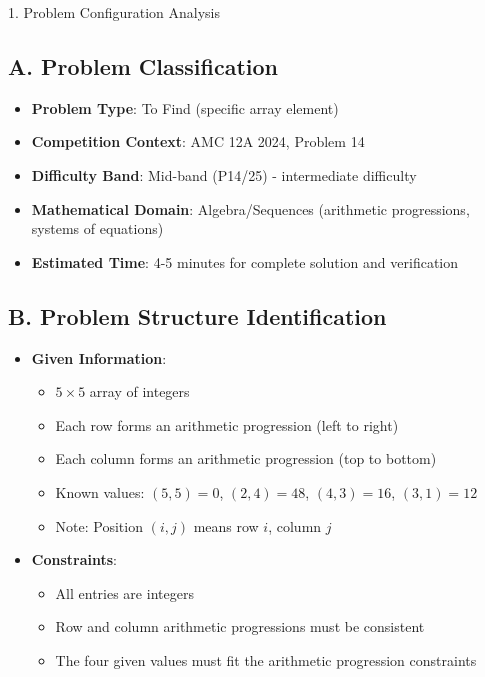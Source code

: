 \documentclass[12pt]{article}
\begin{document}
\begin{configbox}{1. Problem Configuration Analysis}

\subsection*{A. Problem Classification}
\begin{itemize}[leftmargin=*]
    \item \textbf{Problem Type}: To Find (specific array element)
    \item \textbf{Competition Context}: AMC 12A 2024, Problem 14
    \item \textbf{Difficulty Band}: Mid-band (P14/25) - intermediate difficulty
    \item \textbf{Mathematical Domain}: Algebra/Sequences (arithmetic progressions, systems of equations)
    \item \textbf{Estimated Time}: 4-5 minutes for complete solution and verification
\end{itemize}

\subsection*{B. Problem Structure Identification}
\begin{itemize}[leftmargin=*]
    \item \textbf{Given Information}: 
    \begin{itemize}
        \item $5 \times 5$ array of integers
        \item Each row forms an arithmetic progression (left to right)
        \item Each column forms an arithmetic progression (top to bottom)
        \item Known values: $(5,5) = 0$, $(2,4) = 48$, $(4,3) = 16$, $(3,1) = 12$
        \item Note: Position $(i,j)$ means row $i$, column $j$
    \end{itemize}
    
    \item \textbf{Constraints}: 
    \begin{itemize}
        \item All entries are integers
        \item Row and column arithmetic progressions must be consistent
        \item The four given values must fit the arithmetic progression constraints
    \end{itemize}
    

\end{itemize}
\end{configbox}
\end{document}
